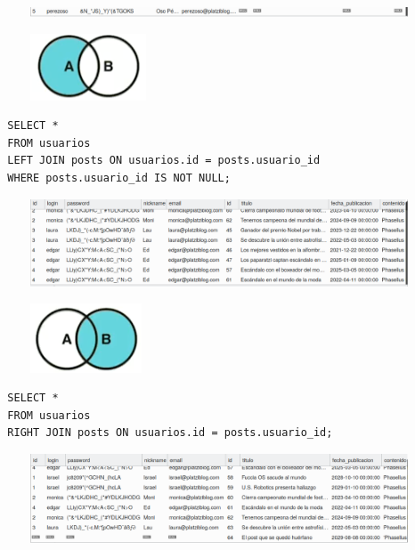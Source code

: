 \documentclass{article}
\begin{document}
\begin{figure}[h!]
  \centering
  \includegraphics[scale=0.55]{./Pictures/088_join_left_perezoso.png}
\end{figure}

\begin{figure}[h!]
  \centering
  \includegraphics[scale=0.75]{./Pictures/090_join_left_not_null.png}
\end{figure}

\begin{verbatim}
  SELECT *
  FROM usuarios
  LEFT JOIN posts ON usuarios.id = posts.usuario_id
  WHERE posts.usuario_id IS NOT NULL;
\end{verbatim}

\begin{figure}[h!]
  \centering
  \includegraphics[scale=0.75]{./Pictures/093_join_left_not_null.png}
\end{figure}


\begin{figure}[h!]
  \centering
  \includegraphics[scale=0.75]{./Pictures/091_join_right.png}
\end{figure}

\begin{verbatim}
  SELECT *
  FROM usuarios
  RIGHT JOIN posts ON usuarios.id = posts.usuario_id;
\end{verbatim}

\begin{figure}[h!]
  \centering
  \includegraphics[scale=0.75]{./Pictures/094_join_right.png}
\end{figure}
\end{document}
